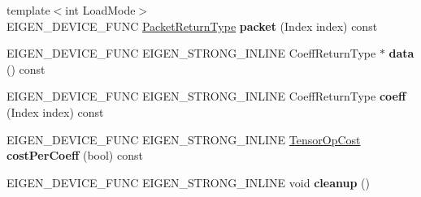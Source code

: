 \begin{DoxyCompactItemize}
{\footnotesize template$<$int Load\+Mode$>$ }\\E\+I\+G\+E\+N\+\_\+\+D\+E\+V\+I\+C\+E\+\_\+\+F\+U\+NC \hyperlink{group___sparse_core___module}{Packet\+Return\+Type} {\bfseries packet} (Index index) const
\item 
\mbox{\label{struct_eigen_1_1_tensor_evaluator_3_01const_01_tensor_scan_op_3_01_op_00_01_arg_type_01_4_00_01_device_01_4_a88c786fe95c4884fb8e800f43356c2b8}} 
E\+I\+G\+E\+N\+\_\+\+D\+E\+V\+I\+C\+E\+\_\+\+F\+U\+NC E\+I\+G\+E\+N\+\_\+\+S\+T\+R\+O\+N\+G\+\_\+\+I\+N\+L\+I\+NE Coeff\+Return\+Type $\ast$ {\bfseries data} () const
\item 
\mbox{\label{struct_eigen_1_1_tensor_evaluator_3_01const_01_tensor_scan_op_3_01_op_00_01_arg_type_01_4_00_01_device_01_4_a0703003e85562fd90000c9d791d18889}} 
E\+I\+G\+E\+N\+\_\+\+D\+E\+V\+I\+C\+E\+\_\+\+F\+U\+NC E\+I\+G\+E\+N\+\_\+\+S\+T\+R\+O\+N\+G\+\_\+\+I\+N\+L\+I\+NE Coeff\+Return\+Type {\bfseries coeff} (Index index) const
\item 
\mbox{\label{struct_eigen_1_1_tensor_evaluator_3_01const_01_tensor_scan_op_3_01_op_00_01_arg_type_01_4_00_01_device_01_4_afec6afac064f8242daaea8a149574223}} 
E\+I\+G\+E\+N\+\_\+\+D\+E\+V\+I\+C\+E\+\_\+\+F\+U\+NC E\+I\+G\+E\+N\+\_\+\+S\+T\+R\+O\+N\+G\+\_\+\+I\+N\+L\+I\+NE \hyperlink{class_eigen_1_1_tensor_op_cost}{Tensor\+Op\+Cost} {\bfseries cost\+Per\+Coeff} (bool) const
\item 
\mbox{\label{struct_eigen_1_1_tensor_evaluator_3_01const_01_tensor_scan_op_3_01_op_00_01_arg_type_01_4_00_01_device_01_4_ac8bc0e2e65872986497524d3c9682912}} 
E\+I\+G\+E\+N\+\_\+\+D\+E\+V\+I\+C\+E\+\_\+\+F\+U\+NC E\+I\+G\+E\+N\+\_\+\+S\+T\+R\+O\+N\+G\+\_\+\+I\+N\+L\+I\+NE void {\bfseries cleanup} ()
\item 
\mbox{\label{struct_eigen_1_1_tensor_evaluator_3_01const_01_tensor_scan_op_3_01_op_00_01_arg_type_01_4_00_01_device_01_4_a2ee167468283faaf509984424b79d9bd}} 

\end{DoxyCompactItemize}
